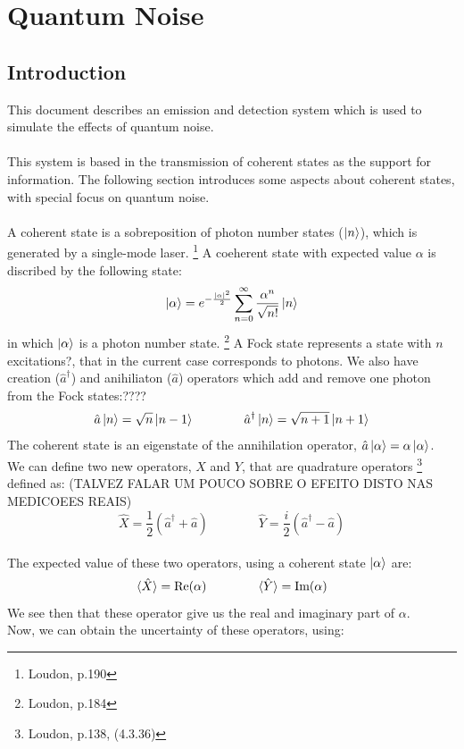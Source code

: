 \clearpage
\section{Quantum Noise}

\subsection*{Introduction}\label{sec:intro}


This document describes an emission and detection system which is used to simulate the effects of quantum noise.
\\
\\
This system is based in the transmission of coherent states as the support for information. The following section introduces some aspects about coherent states, with special focus on quantum noise.\\
\\
A coherent state is a sobreposition of photon number states ($\ket{n}$), which is generated by a single-mode laser.
\footnote{Loudon, p.190}
A coeherent state with expected value $\alpha$ is discribed by the following state:
$$
\ket{\alpha} = e^{-\frac{|\alpha|^2}{2}} \sum_{n=0}^\infty \frac{\alpha^n}{\sqrt{n!}} \ket{n}
$$
in which $\ket{\alpha}$ is a photon number state.
\footnote{Loudon, p.184}
A Fock state represents a state with $n$ excitations?, that in the current case corresponds to photons. We also have creation ($\hat{a}^\dagger$) and anihiliaton ($\hat{a}$) operators which add and remove one photon from the Fock states:????$$
\hat{a} \ket{n} = \sqrt{n} \ket{n-1} \qquad \qquad \hat{a}^\dagger \ket{n} = \sqrt{n+1} \ket{n+1}
$$
The coherent state is an eigenstate of the annihilation operator, $\hat{a}\ket{\alpha} = \alpha \ket{\alpha}$.\\
We can define two new operators,  $X$ and $Y$, that are quadrature operators
\footnote{Loudon, p.138, (4.3.36)}
defined as: (TALVEZ FALAR UM POUCO SOBRE O EFEITO DISTO NAS MEDICOEES REAIS)
$$
\hat{X} = \frac{1}{2} \left( \hat{a}^\dagger + \hat{a} \right) \qquad \qquad
\hat{Y} = \frac{i}{2} \left( \hat{a}^\dagger - \hat{a} \right)
$$
\\
The expected value of these two operators, using a coherent state $\ket{\alpha}$ are:
$$
\braket{\hat{X}} = \textrm{Re}(\alpha) \qquad \qquad
\braket{\hat{Y}} = \textrm{Im}(\alpha)
$$
We see then that these operator give us the real and imaginary part of $\alpha$.\\
Now, we can obtain the uncertainty of these operators, using:
